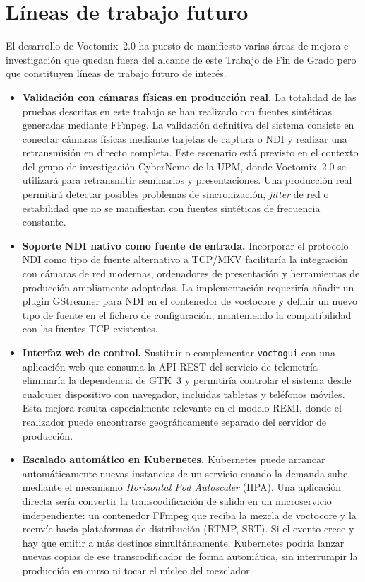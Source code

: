\section{Líneas de trabajo futuro}
\label{sec:lineas_futuras}

El desarrollo de Voctomix~2.0 ha puesto de manifiesto varias áreas de mejora e
investigación que quedan fuera del alcance de este Trabajo de Fin de Grado pero que
constituyen líneas de trabajo futuro de interés.

\begin{itemize}

  \item \textbf{Validación con cámaras físicas en producción real.}
  La totalidad de las pruebas descritas en este trabajo se han realizado con fuentes
  sintéticas generadas mediante FFmpeg. La validación definitiva del sistema consiste
  en conectar cámaras físicas mediante tarjetas de captura o NDI y realizar una
  retransmisión en directo completa. Este escenario está previsto en el contexto del
  grupo de investigación CyberNemo de la UPM, donde Voctomix~2.0 se utilizará para
  retransmitir seminarios y presentaciones. Una producción real permitirá detectar
  posibles problemas de sincronización, \textit{jitter} de red o estabilidad que no
  se manifiestan con fuentes sintéticas de frecuencia constante.

  \item \textbf{Soporte NDI nativo como fuente de entrada.}
  Incorporar el protocolo NDI como tipo de fuente alternativo a TCP/MKV facilitaría
  la integración con cámaras de red modernas, ordenadores de presentación y
  herramientas de producción ampliamente adoptadas. La implementación requeriría
  añadir un plugin GStreamer para NDI en el contenedor de voctocore y definir un
  nuevo tipo de fuente en el fichero de configuración, manteniendo la compatibilidad
  con las fuentes TCP existentes.

  \item \textbf{Interfaz web de control.}
  Sustituir o complementar \texttt{voctogui} con una aplicación web que consuma la
  API REST del servicio de telemetría eliminaría la dependencia de GTK~3 y permitiría
  controlar el sistema desde cualquier dispositivo con navegador, incluidas tabletas
  y teléfonos móviles. Esta mejora resulta especialmente relevante en el modelo REMI,
  donde el realizador puede encontrarse geográficamente separado del servidor de
  producción.

  \item \textbf{Escalado automático en Kubernetes.}
  Kubernetes puede arrancar automáticamente nuevas instancias de un servicio cuando
  la demanda sube, mediante el mecanismo \textit{Horizontal Pod Autoscaler} (HPA).
  Una aplicación directa sería convertir la transcodificación de salida en un
  microservicio independiente: un contenedor FFmpeg que reciba la mezcla de voctocore
  y la reenvíe hacia plataformas de distribución (RTMP, SRT). Si el evento crece y
  hay que emitir a más destinos simultáneamente, Kubernetes podría lanzar nuevas
  copias de ese transcodificador de forma automática, sin interrumpir la producción
  en curso ni tocar el núcleo del mezclador.


\end{itemize}
